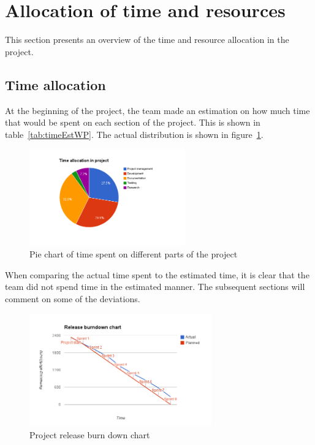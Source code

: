 \section{Allocation of time and resources}
\label{sec:timeSpent}
This section presents an overview of the time and resource allocation in the project.

\subsection{Time allocation}
At the beginning of the project, the team made an estimation on how much time that would be spent on each section of the project. This is shown in table~\ref{tab:timeEstWP}. The actual distribution is shown in figure~\ref{fig:piechart}.

\begin{figure}[H]
\centering
\includegraphics[width=0.6\textwidth, clip, trim=4cm 2cm 4cm 1cm]{ch/retrospect/fig/timePie.png}
\caption{Pie chart of time spent on different parts of the project}
\label{fig:piechart}
\end{figure}

When comparing the actual time spent to the estimated time, it is clear that the team did not spend time in the estimated manner. The subsequent sections will comment on some of the deviations.

\begin{figure}[H]
\centering
\includegraphics[width=0.7\textwidth, clip, trim=1.1cm 0.5cm 1.2cm 1cm]{ch/retrospect/fig/release.png}
\caption{Project release burn down chart}
\label{fig:release}
\end{figure}

